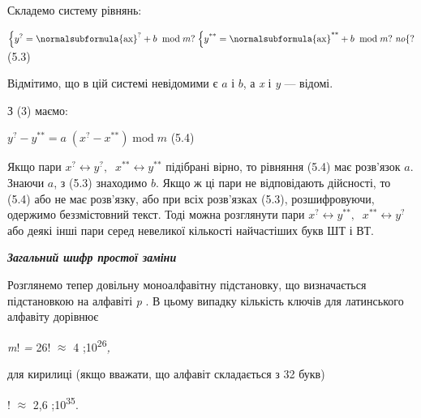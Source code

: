 Складемо систему рівнянь:


\bigskip

{\centering
\textsf{ }
${\begin{matrix}\left\{y^{{?}}=\normalsubformula{\text{ax}}^{{?}}+b\;\;\text{mod}\;m?\right.\left\{y^{{\text{**}}}=\normalsubformula{\text{ax}}^{{\text{**}}}+b\;\;\text{mod}\;m?\right.\mathit{no}\hfill\null
\end{matrix}\{?}$\textsf{  }(5.3)
\par}


\bigskip

Відмітимо, що в цій системі невідомими є  ${a}$ і   ${b}$, а 
\textit{x}\textbf{\textit{ }}і\textbf{\textit{ }}\textit{ }\textit{y} --- відомі.

З (3)\textbf{ }маємо:

{\centering
\textsf{ }
${y^{{?}}-y^{{\text{**}}}=a\;(x^{{?}}-x^{{\text{**}}})\;\text{mod}\;m}$\textsf{
 }(5.4)
\par}


\bigskip

Якщо пари  ${x^{{?}}\leftrightarrow y^{{?}},\;\;x^{{\text{**}}}\leftrightarrow
y^{{\text{**}}}}$ підібрані  вірно, то рівняння (5.4) має розв’язок  ${a}$.
Знаючи  ${a}$, з (5.3) знаходимо  ${b}$. Якщо ж ці пари не відповідають
дійсності, то (5.4) або не має розв’язку, або при всіх розв’язках (5.3),
розшифровуючи, одержимо беззмістовний текст. Тоді можна розглянути пари 
${x^{{?}}\leftrightarrow y^{{\text{**}}},\;\;x^{{\text{**}}}\leftrightarrow
y^{{?}}}$ або деякі інші пари серед невеликої кількості найчастіших букв ШТ і
ВТ.


\bigskip


\bigskip

{\centering\bfseries\itshape
Загальний шифр простої заміни
\par}


\bigskip


\bigskip

Розглянемо тепер довільну моноалфавітну підстановку, що визначається
підстановкою  на алфавіті  \textit{\textgreek{p}}\textbf{\textit{ }}. В цьому
випадку кількість ключів для латинського алфавіту дорівнює

{\centering
\textit{m}!\textit{ = }26!\textit{ ${\approx}$}\textsf{ }4
\textgreek{;}10\textsuperscript{26}\textit{,}
\par}

для кирилиці (якщо вважати, що алфавіт складається з 32 букв)

{! ${\approx}$ 2,6 \textgreek{;}10\textsuperscript{35}.
\par}

